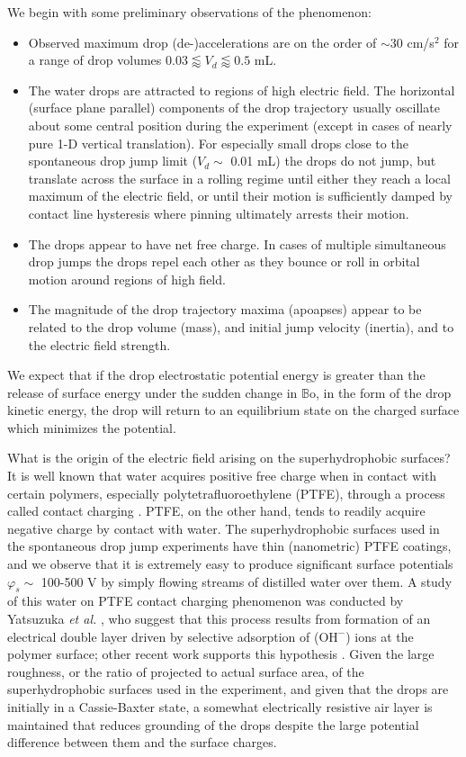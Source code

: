 \documentclass[aip,reprint, floatfix]{revtex4-1}
\begin{document}
We begin with some preliminary observations of the phenomenon:
\begin{itemize}
\item Observed maximum drop (de-)accelerations are on the order of $\sim$30 cm/s$^2$ for a range of drop volumes $0.03 \lessapprox V_d \lessapprox 0.5$ mL.
\item The water drops are attracted to regions of high electric field. The horizontal (surface plane parallel) components of the drop trajectory usually oscillate about some central position during the experiment (except in cases of nearly pure 1-D vertical translation). For especially small drops close to the spontaneous drop jump limit ($V_d \sim$ 0.01 mL) the drops do not jump, but translate across the surface in a rolling regime until either they reach a local maximum of the electric field, or until their motion is sufficiently damped by contact line hysteresis where pinning ultimately arrests their motion.
\item The drops appear to have net free charge. In cases of multiple simultaneous drop jumps the drops repel each other as they bounce or roll in orbital motion around regions of high field.
\item The magnitude of the drop trajectory maxima (apoapses) appear to be related to the drop volume (mass), and initial jump velocity (inertia), and to the electric field strength.
\end{itemize}

We expect that if the drop electrostatic potential energy is greater than the release of surface energy under the sudden change in $\mathbb{B}\mbox{o}$, in the form of the drop kinetic energy, the drop will return to an equilibrium state on the charged surface which minimizes the potential.

What is the origin of the electric field arising on the superhydrophobic surfaces? It is well known that water acquires positive free charge when in contact with certain polymers, especially polytetrafluoroethylene (PTFE), through a process called contact charging \cite{langmuir_surface_1938}. PTFE, on the other hand, tends to readily acquire negative charge by contact with water. The superhydrophobic surfaces used in the spontaneous drop jump experiments have thin (nanometric) PTFE coatings, and we observe that it is extremely easy to produce significant surface potentials $\varphi_s \sim$ 100-500 V by simply flowing streams of distilled water over them. A study of this water on PTFE contact charging phenomenon was conducted by Yatsuzuka \emph{et al.} \cite{yatsuzuka_electrification_1994}, who suggest that this process results from formation of an electrical double layer driven by selective adsorption of ($\mbox{OH}^-$) ions at the polymer surface; other recent work supports this hypothesis \cite{beattie_intrinsic_2006, strazdaite_water_2015}. Given the large roughness, or the ratio of projected to actual surface area, of the superhydrophobic surfaces used in the experiment, and given that the drops are initially in a Cassie-Baxter state, a somewhat electrically resistive air layer is maintained that reduces grounding of the drops despite the large potential difference between them and the surface charges.
\end{document}
